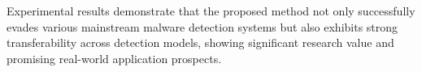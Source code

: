 \begin{abstractEn}
  Experimental results demonstrate that the proposed method not only successfully evades various mainstream malware detection systems but also exhibits strong transferability across detection models, showing significant research value and promising real-world application prospects.
\end{abstractEn}

